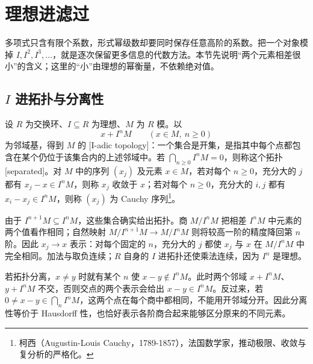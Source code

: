 
\section{理想进滤过}
\label{b3:sec:1301}


多项式只含有限个系数，形式幂级数却要同时保存任意高阶的系数。把一个对象模掉 \(I,I^2,I^3,\ldots\)，就是逐次保留更多信息的代数方法。本节先说明“两个元素相差很小”的含义；这里的“小”由理想的幂衡量，不依赖绝对值。

\subsection{\texorpdfstring{\(I\)}{I} 进拓扑与分离性}
\label{b3:subsec:1301:01}

\begin{definition}\label{b3:def:adic-topology}
	设 \(R\) 为交换环、\(I\subseteq R\) 为理想、\(M\) 为 \(R\) 模。以
	\[
		x+I^nM\qquad(x\in M,\ n\ge0)
	\]
	为邻域基，得到 \(M\) 的 [I-adic topology]：一个集合是开集，是指其中每个点都包含在某个仍位于该集合内的上述邻域中。若 \(\bigcap_{n\ge0}I^nM=0\)，则称这个拓扑[separated]。对 \(M\) 中的序列 \((x_j)\) 及元素 \(x\in M\)，若对每个 \(n\ge0\)，充分大的 \(j\) 都有 \(x_j-x\in I^nM\)，则称 \(x_j\) 收敛于 \(x\)；若对每个 \(n\ge0\)，充分大的 \(i,j\) 都有 \(x_i-x_j\in I^nM\)，则称 \((x_j)\) 为 Cauchy 序列\footnote{柯西（Augustin-Louis Cauchy，1789-1857），法国数学家，推动极限、收敛与复分析的严格化。}。
\end{definition}

由于 \(I^{n+1}M\subseteq I^nM\)，这些集合确实给出拓扑。商 \(M/I^nM\) 把相差 \(I^nM\) 中元素的两个值看作相同；自然映射 \(M/I^{n+1}M\to M/I^nM\) 则将较高一阶的精度降回第 \(n\) 阶。因此 \(x_j\to x\) 表示：对每个固定的 \(n\)，充分大的 \(j\) 都使 \(x_j\) 与 \(x\) 在 \(M/I^nM\) 中完全相同。加法与取负连续；\(R\) 自身的 \(I\) 进拓扑还使乘法连续，因为 \(I^n\) 是理想。

若拓扑分离，\(x\ne y\) 时就有某个 \(n\) 使 \(x-y\notin I^nM\)。此时两个邻域 \(x+I^nM\)、\(y+I^nM\) 不交，否则交点的两个表示会给出 \(x-y\in I^nM\)。反过来，若 \(0\ne x-y\in\bigcap_n I^nM\)，这两个点在每个商中都相同，不能用开邻域分开。因此分离性等价于 Hausdorff 性，也恰好表示各阶商合起来能够区分原来的不同元素。

